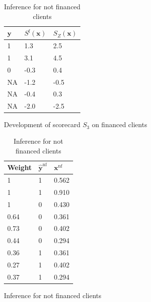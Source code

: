 \begin{table}
{\begin{multicols}{4}
\begin{subfigure}[t]{0.22\textwidth}
\begin{center}
\begin{adjustbox}{max width=0.95\textwidth}
\begin{tabular}{l l l}
\toprule
\textbf{${\bm{y}}$} & \textbf{$S^{\text{f}}({\bm{x}})$} & \textbf{$S_Z({\bm{x}})$}\\
\midrule
1 & 1.3 & 2.5\\
1 & 3.1 & 4.5 \\
0 & -0.3 & 0.4 \\
NA & -1.2 & -0.5 \\
NA & -0.4 & 0.3 \\
NA & -2.0 & -2.5 \\
\bottomrule
\end{tabular}
\end{adjustbox}
\end{center}

\caption{Development of scorecard $S_3$ on financed clients}
\label{twins:sfig3}
\end{subfigure}

\columnbreak

\begin{subfigure}[t]{0.22\textwidth}
\begin{center}
\begin{adjustbox}{max width=0.95\textwidth}
\begin{tabular}{l l l}
\toprule
\textbf{Weight} & \textbf{$\hat{\bm{y}}^{\text{nf}}$} & \textbf{${\bm{x}}^{\text{nf}}$}\\
\midrule
1 & 1 & 0.562 \\
1 & 1 & 0.910 \\
1 & 0 & 0.430 \\
0.64 & 0 & 0.361 \\
0.73 & 0 & 0.402 \\
0.44 & 0 & 0.294 \\
0.36 & 1 & 0.361 \\
0.27 & 1 & 0.402 \\
0.37 & 1 & 0.294 \\
\bottomrule
\end{tabular}
\end{adjustbox}
\end{center}

\caption{Inference for not financed clients}
\label{twins:sfig4}
\end{subfigure}

\end{multicols}
}
\end{table}

